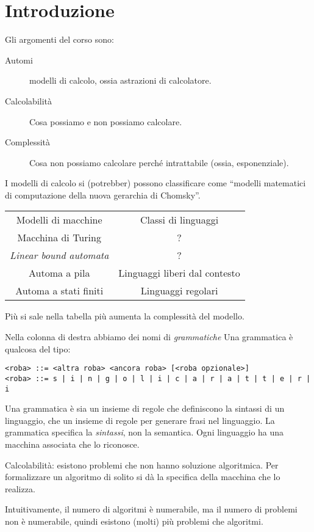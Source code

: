 
\chapter{Introduzione}

Gli argomenti del corso sono:
\begin{description}
	\item[Automi] modelli di calcolo, ossia astrazioni di calcolatore.
	\item[Calcolabilit\`a] Cosa possiamo e non possiamo calcolare.
	\item[Complessit\`a] Cosa non possiamo calcolare perch\'e intrattabile (ossia, esponenziale).
\end{description}

I modelli di calcolo si (potrebber) possono classificare come ``modelli matematici di computazione della nuova gerarchia di Chomsky''.
\begin{center}
\begin{tabular}{cc}
	Modelli di macchine & Classi di linguaggi \\
	Macchina di Turing & ? \\
	\emph{Linear bound automata} & ? \\
	Automa a pila & Linguaggi liberi dal contesto \\
	Automa a stati finiti & Linguaggi regolari
\end{tabular}
\end{center}

Pi\`u si sale nella tabella pi\`u aumenta la complessit\`a del modello.

Nella colonna di destra abbiamo dei nomi di \emph{grammatiche}
Una grammatica \`e qualcosa del tipo:
\begin{verbatim}
<roba> ::= <altra roba> <ancora roba> [<roba opzionale>]
<roba> ::= s | i | n | g | o | l | i | c | a | r | a | t | t | e | r | i
\end{verbatim}
Una grammatica \`e sia un insieme di regole che definiscono la sintassi di un linguaggio, che un insieme di regole per generare frasi nel linguaggio.
La grammatica specifica la \emph{sintassi}, non la semantica.
Ogni linguaggio ha una macchina associata che lo riconosce.

Calcolabilit\`a: esistono problemi che non hanno soluzione algoritmica.
Per formalizzare un algoritmo di solito si d\`a la specifica della macchina che lo realizza.

Intuitivamente, il numero di algoritmi \`e numerabile, ma il numero di problemi non \`e numerabile, quindi esistono (molti) pi\`u problemi che algoritmi.

